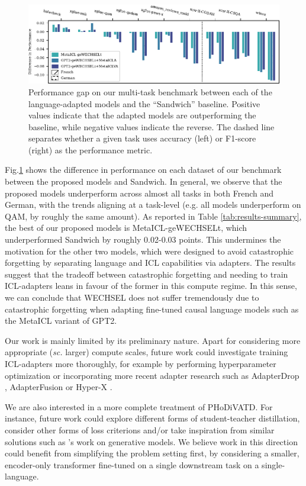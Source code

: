 \documentclass[11pt]{article}
\begin{document}
\begin{figure}[ht]
	\includegraphics{results.pdf}
	\caption{Performance gap on our multi-task benchmark between each of the language-adapted models
		and the ``Sandwich'' baseline. Positive values indicate that the adapted models are
		outperforming the baseline, while negative values indicate the reverse. The dashed line
		separates whether a given task uses accuracy (left) or F1-score (right) as the performance
		metric.}
	\label{fig:results}
\end{figure}

Fig.\@ \ref{fig:results} shows the difference in performance on each dataset of our benchmark
between the proposed models and Sandwich. In general, we observe that the proposed models
underperform across almost all tasks in both French and German, with the trends aligning at
a task-level (e.g. all models underperform on QAM, by roughly the same amount). As reported in Table
\ref{tab:results-summary}, the best of our proposed models is MetaICL-geWECHSELt, which
underperformed Sandwich by roughly 0.02-0.03 points. This undermines the motivation for the other
two models, which were designed to avoid catastrophic forgetting by separating language and ICL
capabilities via adapters. The results suggest that the tradeoff between catastrophic forgetting and
needing to train ICL-adapters leans in favour of the former in this compute regime. In this sense,
we can conclude that WECHSEL does not suffer tremendously due to catastrophic forgetting when
adapting fine-tuned causal language models such as the MetaICL variant of GPT2.

Our work is mainly limited by its preliminary nature. Apart for considering more appropriate
(\textit{sc.} larger) compute scales, future work could investigate training ICL-adapters more
thoroughly, for example by performing hyperparameter optimization or incorporating more recent
adapter research such as AdapterDrop \citep{ruckle_adapterdrop_2021}, AdapterFusion
\citep{pfeiffer_adapterfusion_2021} or Hyper-X \citep{ustun_hyper-x_2022}.

We are also interested in a more complete treatment of PHoDiVATD. For instance, future work could
explore different forms of student-teacher distillation, consider other forms of loss criterions
and/or take inspiration from similar solutions such as \citet{khrulkov_disentangled_2021}'s work on
generative models. We believe work in this direction could benefit from simplifying the problem
setting first, by considering a smaller, encoder-only transformer fine-tuned on a single downstream
task on a single-language.
\end{document}
